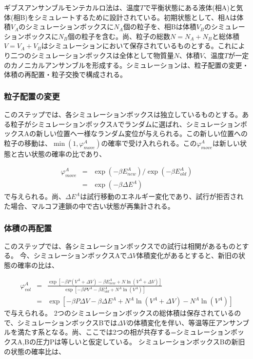 \documentclass[titlepage]{jsreport}
\begin{document}
ギブスアンサンブルモンテカルロ法は、温度$T$で平衡状態にある液体(相A)と気体(相B)をシミュレートするために設計されている\cite{gibbs-ensemble-panagiotopoulos-2}。初期状態として、相Aは体積$V_A$のシミュレーションボックスに$N_A$個の粒子を、相Bは体積$V_B$のシミュレーションボックスに$N_B$個の粒子を含む。尚、粒子の総数$N=N_A+N_B$と総体積$V=V_A+V_B$はシミュレーションにおいて保存されているものとする。これにより二つのシミュレーションボックスは全体として物質量$N$、体積$V$、温度$T$が一定のカノニカルアンサンブルを形成する。シミュレーションは、粒子配置の変更・体積の再配置・粒子交換で構成される。

\subsubsection{粒子配置の変更}\label{principle-subsubsec:particle-displacement}
このステップでは、各シミュレーションボックスは独立しているものとする。ある粒子がシミュレーションボックスAでランダムに選ばれ、シミュレーションボックスAの新しい位置へ一様なランダム変位が与えられる。この新しい位置への粒子の移動は、$\min(1, \varphi_{move}^A)$の確率で受け入れられる。この$\varphi_{move}^A$は新しい状態と古い状態の確率の比であり、

\large
\begin{eqnarray}
\varphi_{move}^A &=& \exp(-{\beta}E_{new}^A)/\exp(-{\beta}E_{old}^A) \nonumber\\
                 &=& \exp(-{\beta}{\Delta}E^A)\label{eq:particle-displacement-probability}
\end{eqnarray}
\normalsize
で与えられる。尚、${\Delta}E^A$は試行移動のエネルギー変化であり、試行が拒否された場合、マルコフ連鎖の中で古い状態が再集計される。

\subsubsection{体積の再配置}\label{principle-subsubsec:volume-rearrangement}
このステップでは、各シミュレーションボックスでの試行は相関があるものとする。
今、シミュレーションボックスAで$\Delta{V}$体積変化があるとすると、新旧の状態の確率の比は、

\large
\begin{eqnarray}
\varphi_{vol}^A &=& \frac{\exp[-{\beta}P(V^A+{\Delta}V)-{\beta}E^A_{new}+N\ln(V^A+{\Delta}V)]}{\exp[-{\beta}PV^A-{\beta}E^A_{old}+N^A\ln(V^A)]} \nonumber\\
                &=& \exp[-{\beta}P{\Delta}V-{\beta}{\Delta}E^A+N^A\ln(V^A+{\Delta}V)-N^A\ln(V^A)]\label{eq:volume-rearrangement-probability-A}
\end{eqnarray}
\normalsize
で与えられる。
2つのシミュレーションボックスの総体積は保存されているので、シミュレーションボックスBでは${\Delta}V$の体積変化を伴い、等温等圧アンサンブルを満たす系となる。尚、ここでは2つの相が共存する=シミュレーションボックスA,Bの圧力Pは等しいと仮定している。
シミュレーションボックスBの新旧の状態の確率比は、
\end{document}
